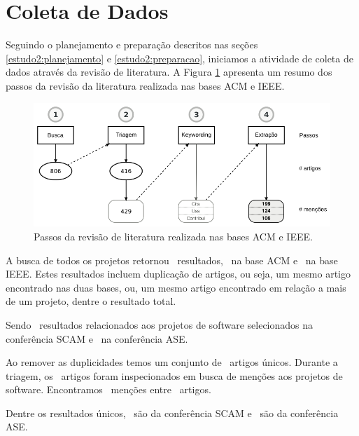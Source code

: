 
\section{Coleta de Dados} \label{estudo2:coleta} %

Seguindo o planejamento e preparação descritos nas seções
\ref{estudo2:planejamento} e \ref{estudo2:preparacao}, iniciamos a atividade de coleta de
dados através da revisão de literatura.
A Figura \ref{estudo2-revisao-literatura} apresenta um resumo dos passos da revisão da literatura
realizada nas bases ACM e IEEE.

\begin{figure}[h]
  \center
  \includegraphics[scale=0.35]{imagens/estudo2-revisao-literatura.png}
  \caption{Passos da revisão de literatura realizada nas bases ACM e IEEE.}
  \label{estudo2-revisao-literatura}
\end{figure}

A busca de todos os projetos retornou \SearchCount \ resultados,
\SearchACMCount \ na base ACM e \SearchIEEECount \ na base IEEE.
Estes resultados incluem duplicação de artigos, ou seja,
um mesmo artigo encontrado nas duas bases, ou, um mesmo artigo
encontrado em relação a mais de um projeto, dentre o resultado total.


Sendo \SearchSCAMCount \ resultados relacionados aos projetos de software
selecionados na conferência SCAM e \SearchASECount \ na conferência ASE.

Ao remover as duplicidades temos um conjunto de \SearchUniqueCount \ artigos
únicos. Durante a triagem, 
os \SearchUniqueCount \ artigos foram inspecionados em busca de menções aos
projetos de software. Encontramos \ScreeningCount \ menções entre
\ScreeningUniqueCount \ artigos.

Dentre os resultados únicos, \SearchUniqueSCAMCount \ são da conferência SCAM e
\SearchUniqueASECount \ são da conferência ASE.

